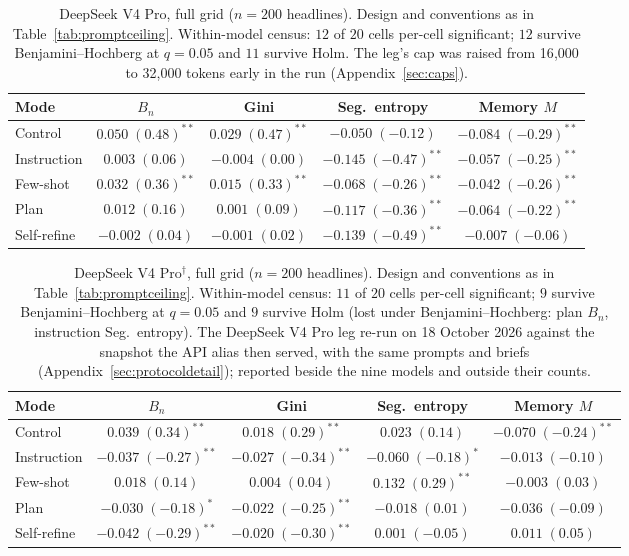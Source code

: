 \begin{table}[htbp]
\centering
\small
\caption{DeepSeek V4 Pro, full grid ($n=200$ headlines). Design and conventions as in Table~\ref{tab:promptceiling}. Within-model census: $12$ of $20$ cells per-cell significant; $12$ survive Benjamini--Hochberg at $q=0.05$ and $11$ survive Holm. The leg's cap was raised from 16{,}000 to 32{,}000 tokens early in the run (Appendix~\ref{sec:caps}).}
\label{tab:grid-deepseek}
\begin{tabular}{lcccc}
\toprule
Mode & $B_n$ & Gini & Seg.\ entropy & Memory $M$ \\
\midrule
Control & $0.050\;(0.48)^{**}$ & $0.029\;(0.47)^{**}$ & $-0.050\;(-0.12)$ & $-0.084\;(-0.29)^{**}$ \\
Instruction & $0.003\;(0.06)$ & $-0.004\;(0.00)$ & $-0.145\;(-0.47)^{**}$ & $-0.057\;(-0.25)^{**}$ \\
Few-shot & $0.032\;(0.36)^{**}$ & $0.015\;(0.33)^{**}$ & $-0.068\;(-0.26)^{**}$ & $-0.042\;(-0.26)^{**}$ \\
Plan & $0.012\;(0.16)$ & $0.001\;(0.09)$ & $-0.117\;(-0.36)^{**}$ & $-0.064\;(-0.22)^{**}$ \\
Self-refine & $-0.002\;(0.04)$ & $-0.001\;(0.02)$ & $-0.139\;(-0.49)^{**}$ & $-0.007\;(-0.06)$ \\
\bottomrule
\end{tabular}
\end{table}

\begin{table}[htbp]
\centering
\small
\caption{DeepSeek V4 Pro$^{\dagger}$, full grid ($n=200$ headlines). Design and conventions as in Table~\ref{tab:promptceiling}. Within-model census: $11$ of $20$ cells per-cell significant; $9$ survive Benjamini--Hochberg at $q=0.05$ and $9$ survive Holm (lost under Benjamini--Hochberg: plan $B_n$, instruction Seg.\ entropy). The DeepSeek V4 Pro leg re-run on 18 October 2026 against the snapshot the API alias then served, with the same prompts and briefs (Appendix~\ref{sec:protocoldetail}); reported beside the nine models and outside their counts.}
\label{tab:grid-deepseek1018}
\begin{tabular}{lcccc}
\toprule
Mode & $B_n$ & Gini & Seg.\ entropy & Memory $M$ \\
\midrule
Control & $0.039\;(0.34)^{**}$ & $0.018\;(0.29)^{**}$ & $0.023\;(0.14)$ & $-0.070\;(-0.24)^{**}$ \\
Instruction & $-0.037\;(-0.27)^{**}$ & $-0.027\;(-0.34)^{**}$ & $-0.060\;(-0.18)^{*}$ & $-0.013\;(-0.10)$ \\
Few-shot & $0.018\;(0.14)$ & $0.004\;(0.04)$ & $0.132\;(0.29)^{**}$ & $-0.003\;(0.03)$ \\
Plan & $-0.030\;(-0.18)^{*}$ & $-0.022\;(-0.25)^{**}$ & $-0.018\;(0.01)$ & $-0.036\;(-0.09)$ \\
Self-refine & $-0.042\;(-0.29)^{**}$ & $-0.020\;(-0.30)^{**}$ & $0.001\;(-0.05)$ & $0.011\;(0.05)$ \\
\bottomrule
\end{tabular}
\end{table}

